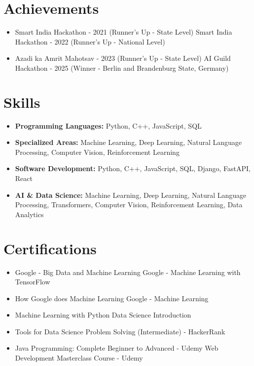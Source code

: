 \documentclass[a4paper,10pt]{article}
\begin{document}
\section*{Achievements}
\begin{itemize}
\item Smart India Hackathon - 2021 (Runner's Up - State Level) \hfill Smart India Hackathon - 2022 (Runner's Up - National Level)
\item Azadi ka Amrit Mahotsav - 2023 (Runner's Up - State Level) \hfill AI Guild Hackathon - 2025 (Winner - Berlin and Brandenburg State, Germany)
\end{itemize}

\section*{Skills}
\begin{itemize}
  \item \textbf{Programming Languages:} Python, C++, JavaScript, SQL
  \item \textbf{Specialized Areas:} Machine Learning, Deep Learning, Natural Language Processing, Computer Vision, Reinforcement Learning
  \item \textbf{Software Development:} Python, C++, JavaScript, SQL, Django, FastAPI, React
  \item \textbf{AI \& Data Science:} Machine Learning, Deep Learning, Natural Language Processing, Transformers, Computer Vision, Reinforcement Learning, Data Analytics
\end{itemize}

\section*{Certifications}
\begin{itemize}
\item Google - Big Data and Machine Learning \hfill Google - Machine Learning with TensorFlow
\item How Google does Machine Learning \hfill Google - Machine Learning
\item Machine Learning with Python \hfill Data Science Introduction
\item Tools for Data Science \hfill Problem Solving (Intermediate) - HackerRank
\item Java Programming: Complete Beginner to Advanced - Udemy \hfill Web Development Masterclass Course - Udemy
\end{itemize}
\end{document}
